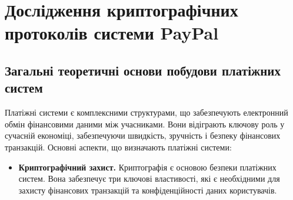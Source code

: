 \chapter{Дослідження криптографічних протоколів системи PayPal}

\section{Загальні теоретичні основи побудови платіжних систем}
Платіжні системи є комплексними структурами, що забезпечують електронний обмін фінансовими даними між учасниками. Вони відіграють ключову роль у сучасній економіці, забезпечуючи швидкість, зручність і безпеку фінансових транзакцій. Основні аспекти, що визначають платіжні системи:


\begin{itemize}

    \item \textbf{Криптографічний захист.} Криптографія є основою безпеки платіжних систем. Вона забезпечує три ключові властивості, які є необхідними для захисту фінансових транзакцій та конфіденційності даних користувачів.
    

\end{itemize}
